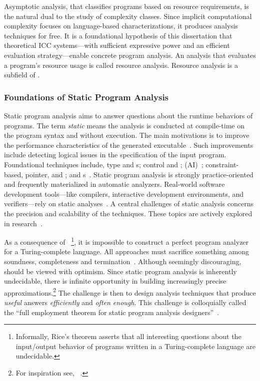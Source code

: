 Asymptotic analysis, that classifies programs based
on resource requirements, is the natural dual to the study of complexity
classes. Since implicit computational complexity focuses on language-based
characterizations, it produces analysis techniques for free. It is a
foundational hypothesis of this dissertation that theoretical ICC systems---with
sufficient expressive power and an efficient evaluation strategy---enable
concrete program analysis. An analysis that evaluates a program's resource usage
is called resource analysis. Resource analysis is a
subfield of .

\subsubsection{Foundations of Static Program Analysis}\label{static-analysis-basics}

Static program analysis aims to answer questions about the runtime behaviors of
programs. The term \emph{static} means the analysis is conducted at compile-time
on the program syntax and without execution. The main motivations is to improve
the performance characteristics of the generated
executable~\cite{nielson2010,kennedy2001}. Such improvements include detecting
logical issues in the specification of the input program. Foundational
techniques include, \eg type and s;
control and ;  (AI)~\cite{cousot2021}; constraint-based, pointer, and ;
and s~\cite{nielson2010,moller2023}. Static program
analysis is strongly practice-oriented and frequently materialized in automatic
analyzers. Real-world software development tools---like compilers, interactive
development environments, and verifiers---rely on static
analyses~\cite{livshits2015}. A central challenges of static analysis concerns
the precision and scalability of the techniques. These topics are actively
explored in research~\cite{schiebel2024,dudina2025,arzt2014}.

As a consequence of ~\cite{rice1953}\footnote{Informally,
Rice's theorem asserts that all interesting questions about the input/output
behavior of programs written in a Turing-complete
language are undecidable.}, it is impossible to construct
a perfect program analyzer for a Turing-complete language. All approaches must
sacrifice something among soundness, completeness and
termination~\cite{moller2024}. Although seemingly discouraging,  should be viewed with optimism. Since static program analysis is
inherently undecidable, there is infinite opportunity in
building increasingly precise approximations.\footnote{For inspiration see,
\eg~\textcite{ding2023}.} The challenge is then to design analysis techniques
that produce \emph{useful} answers \emph{efficiently} and \emph{often enough}.
This challenge is colloquially called the \enquote{full employment theorem for
static program analysis designers}~\cite[p. 4]{moller2023}.

